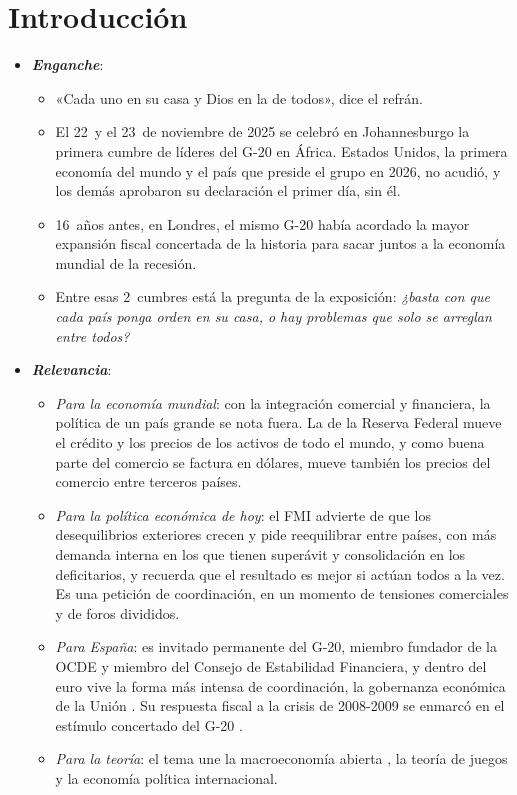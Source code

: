 \documentclass[11pt]{article}
\begin{document}
\tceetitulo

\section*{Introducción}

\begin{itemize}
\item \textbf{\emph{Enganche}}:
  \begin{itemize}
  \item «Cada uno en su casa y Dios en la de todos», dice el refrán.
  \item El 22~y el 23~de noviembre de 2025 se celebró en Johannesburgo la primera cumbre de líderes del G-20 en África. Estados Unidos, la primera economía del mundo y el país que preside el grupo en 2026, no acudió, y los demás aprobaron su declaración el primer día, sin él\nocite{G20Johannesburgo2025}.
  \item 16~años antes, en Londres, el mismo G-20 había acordado la mayor expansión fiscal concertada de la historia para sacar juntos a la economía mundial de la recesión\nocite{G20Londres2009}.
  \item Entre esas 2~cumbres está la pregunta de la exposición: \emph{¿basta con que cada país ponga orden en su casa, o hay problemas que solo se arreglan entre todos?}
  \end{itemize}

\item \textbf{\emph{Relevancia}}:
  \begin{itemize}
  \item \emph{Para la economía mundial}: con la integración comercial y financiera, la política de un país grande se nota fuera. La de la Reserva Federal mueve el crédito y los precios de los activos de todo el mundo\nocite{Rey2013Dilema,MirandaAgrippinoRey2020}, y como buena parte del comercio se factura en dólares, mueve también los precios del comercio entre terceros países\nocite{Gopinath2020DCP}.
  \item \emph{Para la política económica de hoy}: el FMI advierte de que los desequilibrios exteriores crecen y pide reequilibrar entre países, con más demanda interna en los que tienen superávit y consolidación en los deficitarios, y recuerda que el resultado es mejor si actúan todos a la vez\nocite{FMI2026ESR}. Es una petición de coordinación, en un momento de tensiones comerciales y de foros divididos.
  \item \emph{Para España}: es invitado permanente del G-20, miembro fundador de la OCDE y miembro del Consejo de Estabilidad Financiera\nocite{FSB2026Miembros}, y dentro del euro vive la forma más intensa de coordinación, la gobernanza económica de la Unión . Su respuesta fiscal a la crisis de 2008-2009 se enmarcó en el estímulo concertado del G-20 .
  \item \emph{Para la teoría}: el tema une la macroeconomía abierta , la teoría de juegos  y la economía política internacional.
  \end{itemize}


\end{itemize}
\end{document}
